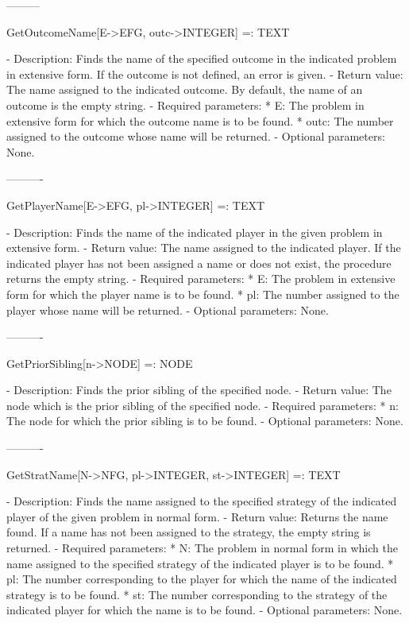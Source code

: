 {---------

GetOutcomeName[E->EFG, outc->INTEGER] =: TEXT

   -	Description:  Finds the name of the specified outcome in the indicated
	problem in extensive form.  If the outcome is not defined, an error is
	given.
   -	Return value:  The name assigned to the indicated outcome.  By default,
	the name of an outcome is the empty string.
   -	Required parameters:
	  *  E:  The problem in extensive form for which the outcome name is to
		be found.
	  *  outc:  The number assigned to the outcome whose name will be 
		returned.
   -	Optional parameters:  None.

----------

GetPlayerName[E->EFG, pl->INTEGER] =: TEXT

   -	Description:  Finds the name of the indicated player in the given 
	problem in extensive form.
   -	Return value:  The name assigned to the indicated player.  If the 
	indicated player has not been assigned a name or does not exist, the
	procedure returns the empty string.
   -	Required parameters:
	  *  E:  The problem in extensive form for which the player name is to
		be found.
	  *  pl:  The number assigned to the player whose name will be 
		returned.
   -	Optional parameters:  None.

----------

GetPriorSibling[n->NODE] =: NODE

   -	Description:  Finds the prior sibling of the specified node.
   -	Return value:  The node which is the prior sibling of the specified 
	node.
   -	Required parameters:
	  *  n:  The node for which the prior sibling is to be found.
   -	Optional parameters:  None.

----------

GetStratName[N->NFG, pl->INTEGER, st->INTEGER] =: TEXT

   -	Description:  Finds the name assigned to the specified strategy of the
	indicated player of the given problem in normal form.
   -	Return value:  Returns the name found.  If a name has not been assigned
	to the strategy, the empty string is returned.
   -	Required parameters:
	  *  N:  The problem in normal form in which the name assigned to the 
		specified strategy of the indicated player is to be found.
	  *  pl:  The number corresponding to the player for which the name of
		the indicated strategy is to be found.
	  *  st:  The number corresponding to the strategy of the indicated 
		player for which the name is to be found.
   -	Optional parameters:  None.

}
